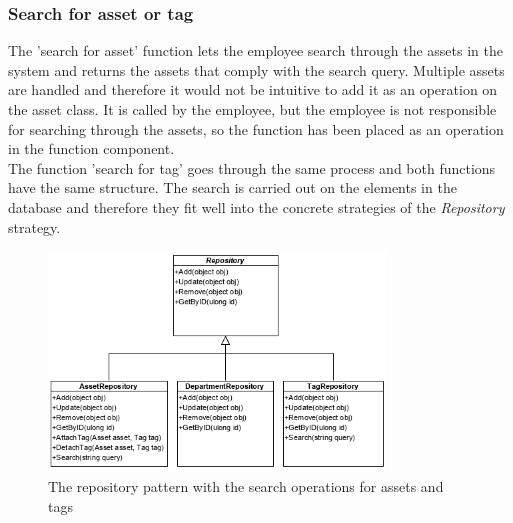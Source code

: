 \subsubsection{Search for asset or tag}
The 'search for asset' function lets the employee search through the assets in the system and returns the assets that comply with the search query. Multiple assets are handled and therefore it would not be intuitive to add it as an operation on the asset class. It is called by the employee, but the employee is not responsible for searching through the assets, so the function has been placed as an operation in the function component.\\
The function 'search for tag' goes through the same process and both functions have the same structure. The search is carried out on the elements in the database and therefore they fit well into the concrete strategies of the \textit{Repository} strategy.
\begin{figure}[H]
    \centering
    \includegraphics[width=0.8\textwidth]{figures/FunctionComponent/Repository_pattern_with_search.png}
    \caption{The repository pattern with the search operations for assets and tags}
    \label{fig:RepositoryPatternWithSearch}
\end{figure}

